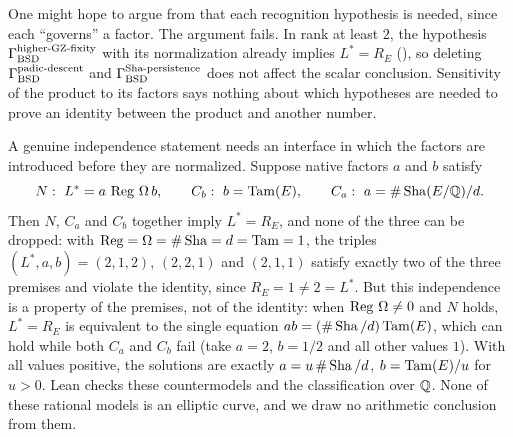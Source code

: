 \begin{remark}\label{rmk:closure:sensitivity-not-necessity}
One might hope to argue from  that
each recognition hypothesis is needed, since each ``governs'' a factor.
The argument fails.  In rank at least $2$, the hypothesis $\Gamma_{\mathrm{BSD}}^{\mathrm{higher\text{-}GZ\text{-}fixity}}$ with
its normalization already implies $L^*=R_E$
(), so deleting $\Gamma_{\mathrm{BSD}}^{\mathrm{padic\text{-}descent}}$ and $\Gamma_{\mathrm{BSD}}^{\mathrm{Sha\text{-}persistence}}$
does not affect the scalar conclusion.  Sensitivity of the product to its
factors says nothing about which hypotheses are needed to prove an
identity between the product and another number.

A genuine independence statement needs an interface in which the factors
are introduced before they are normalized.  Suppose native factors $a$ and
$b$ satisfy
\[
  N:\ L^*=a\,\operatorname{Reg}\,\Omega\,b,\qquad
  C_b:\ b=\operatorname{Tam}(E),\qquad
  C_a:\ a=\#\operatorname{Sha}(E/\mathbb{Q})/d .
\]
Then $N$, $C_a$ and $C_b$ together imply $L^*=R_E$, and none of the three
can be dropped: with $\operatorname{Reg}=\Omega=\#\operatorname{Sha}=d=\operatorname{Tam}=1$, the triples
$(L^*,a,b)=(2,1,2)$, $(2,2,1)$ and $(2,1,1)$ satisfy exactly two of the
three premises and violate the identity, since $R_E=1\neq2=L^*$.  But
this independence is a property of the premises, not of the identity:
when $\operatorname{Reg}\,\Omega\neq0$ and $N$ holds, $L^*=R_E$ is equivalent to the
single equation $ab=(\#\operatorname{Sha}/d)\operatorname{Tam}(E)$, which can hold while both $C_a$
and $C_b$ fail (take $a=2$, $b=1/2$ and all other values $1$).  With
all values positive, the solutions are exactly $a=u\,\#\operatorname{Sha}/d$,
$b=\operatorname{Tam}(E)/u$ for $u>0$.  Lean checks these countermodels and the
classification over $\mathbb{Q}$.  None of these rational models is an elliptic
curve, and we draw no arithmetic conclusion from them.
\end{remark}
